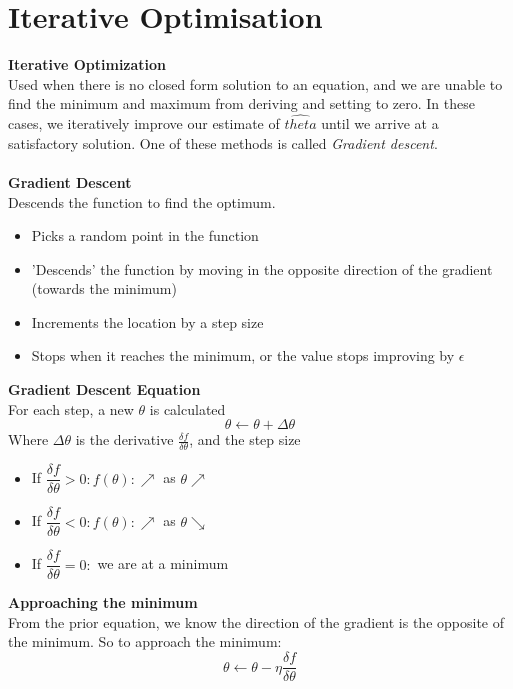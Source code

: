 \documentclass[a4paper,10pt]{article}
\begin{document}
\section*{Iterative Optimisation}
\textcolor{Periwinkle}{\textbf{Iterative Optimization}}\\
Used when there is no closed form solution to an equation, and we are unable to find the minimum and maximum from deriving and setting to zero. In these cases, we iteratively improve our estimate of $\hat{theta}$ until we arrive at a satisfactory solution. One of these methods is called \emph{Gradient descent}. \\\\
\textcolor{Periwinkle}{\textbf{Gradient Descent}}\\
Descends the function to find the optimum. 
\begin{itemize}
	\item Picks a random point in the function 
	\item 'Descends' the function by moving in the opposite direction of the gradient (towards the minimum)
	\item Increments the location by a step size
	\item Stops when it reaches the minimum, or the value stops improving by $\epsilon$
\end{itemize}
\begin{shaded}
	\noindent \textcolor{RoyalPurple}{\textbf{Gradient Descent Equation}}\\
	For each step, a new $\theta$ is calculated
	\begin{equation*}
		\theta \leftarrow \theta + \Delta\theta
	\end{equation*}
	Where $\Delta\theta$ is the derivative $\frac{\delta f}{\delta \theta}$, and the step size
\end{shaded}
\begin{itemize}
	\item If $\dfrac{\delta f}{\delta \theta} > 0: f(\theta): \nearrow$ as $\theta \nearrow$ 
	\item If $\dfrac{\delta f}{\delta \theta} < 0: f(\theta): \nearrow$ as $\theta \searrow$ 
	\item If $\dfrac{\delta f}{\delta \theta} = 0:$ we are at a minimum 
\end{itemize}
\begin{shaded}
	\noindent \textcolor{RoyalPurple}{\textbf{Approaching the minimum}}\\
	From the prior equation, we know the direction of the gradient is the opposite of the minimum. So to approach the minimum: 
	\begin{equation*}
		\theta \leftarrow \theta - \eta \dfrac{\delta f}{\delta \theta}
	\end{equation*}
\end{shaded}
\end{document}
